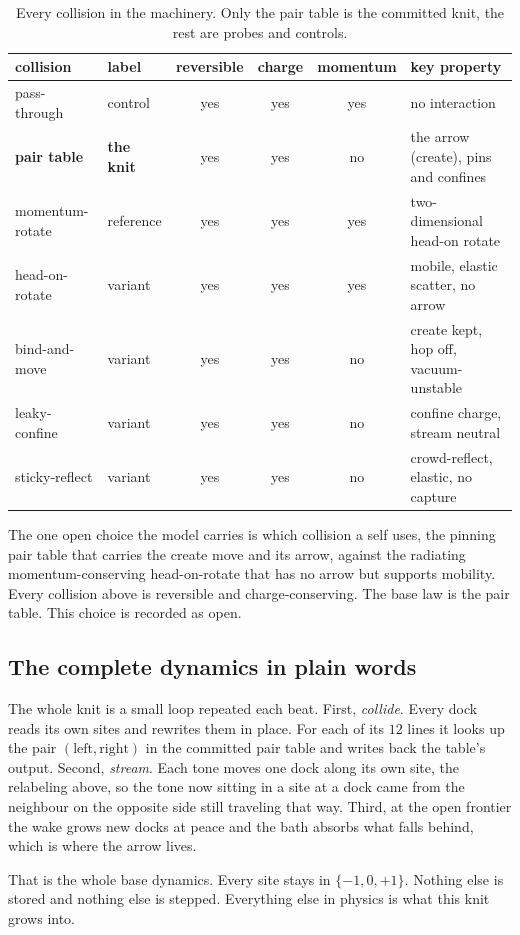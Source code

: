 \begin{table}[ht]
\centering
\begin{tabular}{@{}llcccl@{}}
\toprule
collision & label & reversible & charge & momentum & key property \\
\midrule
pass-through & control & yes & yes & yes & no interaction \\
\textbf{pair table} & \textbf{the knit} & yes & yes & no & the arrow (create), pins and confines \\
momentum-rotate & reference & yes & yes & yes & two-dimensional head-on rotate \\
head-on-rotate & variant & yes & yes & yes & mobile, elastic scatter, no arrow \\
bind-and-move & variant & yes & yes & no & create kept, hop off, vacuum-unstable \\
leaky-confine & variant & yes & yes & no & confine charge, stream neutral \\
sticky-reflect & variant & yes & yes & no & crowd-reflect, elastic, no capture \\
\bottomrule
\end{tabular}
\caption{Every collision in the machinery. Only the pair table is the committed knit, the rest are probes and controls.}
\label{tab:collision-summary}
\end{table}

\begin{result}
The one open choice the model carries is which collision a self uses, the pinning pair table that carries the create move and its arrow, against the radiating momentum-conserving head-on-rotate that has no arrow but supports mobility. Every collision above is reversible and charge-conserving. The base law is the pair table. This choice is recorded as open.
\end{result}

\subsection{The complete dynamics in plain words}

The whole knit is a small loop repeated each beat. First, \emph{collide}. Every dock reads its own sites and rewrites them in place. For each of its $12$ lines it looks up the pair $(\mathrm{left}, \mathrm{right})$ in the committed pair table and writes back the table's output. Second, \emph{stream}. Each tone moves one dock along its own site, the relabeling above, so the tone now sitting in a site at a dock came from the neighbour on the opposite side still traveling that way. Third, at the open frontier the wake grows new docks at peace and the bath absorbs what falls behind, which is where the arrow lives.

That is the whole base dynamics. Every site stays in $\{-1, 0, +1\}$. Nothing else is stored and nothing else is stepped. Everything else in physics is what this knit grows into.
